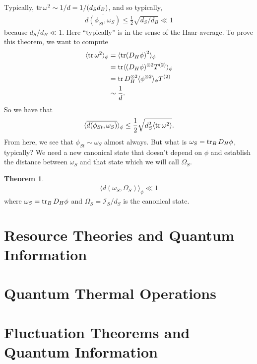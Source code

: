 \documentclass{book}
\theoremstyle{definition}
\newtheorem{thm}{Theorem}[section]
\newcommand{\nn}{\nonumber}
\newcommand{\f}[2]{\frac{#1}{#2}}
\newcommand{\la}{\langle}
\newcommand{\ra}{\rangle}
\newcommand{\Id}{\mathcal{I}}
\begin{document}
Typically, $\tr \omega^2 \sim 1/d = 1/(d_Sd_B)$, and so typically, 
\begin{align}
\overline{d(\phi_{St}, \omega_S)} \leq \f{1}{2}\sqrt{d_S/d_B} \ll 1
\end{align}  
because $d_S/d_B \ll 1$. Here ``typically'' is in the sense of the Haar-average. To prove this theorem, we want to compute
\begin{align}
\la \tr\omega^2 \ra_\phi &= \la \tr (D_H \phi)^2 \ra_\phi \nn\\
&= \tr \la (D_H \phi)^{\otimes 2} T^{(2)} \ra_\phi\nn\\
&= \tr  D_H^{\otimes 2} \la  \phi^{\otimes 2}\ra_\phi T^{(2)}  \nn\\
&\sim \f{1}{d}.
\end{align}
So we have that
\begin{align}
\la \overline{d(\phi_{St}, \omega_S)} \ra_\phi \leq \f{1}{2}\sqrt{d_S^2\la \tr \omega^2 \ra}.
\end{align}
From here, we see that $\phi_{St}\sim \omega_S$ almost always. But what is $\omega_S = \tr_B D_H \phi$, typically? We need a new canonical state that doesn't depend on $\phi$ and establish the distance between $\omega_S$ and that state which we will call $\Omega_S$. 

\begin{thm}
	\begin{align}
	\la d(\omega_S, \Omega_S) \ra_\phi \ll 1 
	\end{align}
	where $\omega_S = \tr_B D_H \phi$ and $\Omega_S = \Id_S/d_S$ is the canonical state. 
\end{thm}










\newpage

\section{Resource Theories and Quantum Information}


\newpage
\section{Quantum Thermal Operations}


    



\newpage
\section{Fluctuation Theorems and Quantum Information}
\end{document}

